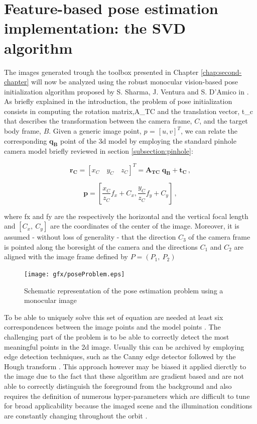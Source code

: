 \section{Feature-based pose estimation implementation: the SVD algorithm}
The images generated  trough the toolbox presented in Chapter \ref{chap:second-chapter} will now be analyzed using the robust monocular vision-based pose initialization algorithm proposed by S. Sharma, J. Ventura and S. D'Amico in \cite{Sharma2018}.
As briefly explained in the introduction, the problem of pose initialization consists in computing the rotation matrix,\gls{A_TC} and the translation vector, \gls{t_c} that describes the transformation between the camera frame, $C$, and the target body frame, $B$. Given a generic image point, $p$ = $ [u,v]^T $, we can relate the corresponding $\mathbf{q_B}$ point of the \acrshort{3d} model by employing the standard pinhole camera model briefly reviewed in section \ref{subsection:pinhole}:

\begin{equation}
  \mathbf{r_C} = \left[x_C \quad  y_C \quad z_C\right]^T = \mathbf{A_{TC}} \; \mathbf{q_B} + \mathbf{t_C} \,,
  \label{eq:rc}
\end{equation}

\begin{equation}
  \mathbf{p} = \left[ \frac{x_C}{z_C} f_x + C_x , \frac{y_C}{z_C} f_y + C_y \right] \,,
  \label{eq:p}
\end{equation}

where \gls{fx} and \gls{fy} are the respectively the horizontal and the vertical focal length and $ \left[C_x, \ C_y \right]$ are the coordinates of the center of the image. Moreover, it is assumed - without loss of generality - that the direction $\mathit{C_3}$ of the camera frame is pointed along the boresight of the camera and the directions $\mathit{C_1}$ and $\mathit{C_2}$ are aligned with the image frame defined by $P = \left( \mathit{P_1}, \ \mathit{P_2} \right)$

\begin{figure}[htbp]
  \centering
  \texttt{[image: gfx/poseProblem.eps]}
  \caption{Schematic representation of the pose estimation problem using a monocular image \cite{Sharma2018}}
  \label{fig:theposeproblem}
\end{figure}

To be able to uniquely solve this set of equation are needed at least six correspondences between the image points and the model points \cite{10.1145/358669.358692}. The challenging part of the problem is to be able to correctly detect the most meaningful points in the \acrshort{2d} image. Usually this can be archived by employing edge detection techniques, such as the Canny edge detector \cite{10.1109/TPAMI.1986.4767851} followed by the Hough transform \cite{10.1145/361237.361242}. This approach however may be biased it applied dierctly to the image due to the fact that these algorithm are gradient based and are not able to correctly distinguish the foreground from the background and also requires the definition of numerous hyper-parameters which are difficult to tune for broad applicability because the imaged scene and the illumination conditions are constantly changing throughout the orbit \cite{Sharma2018}.

